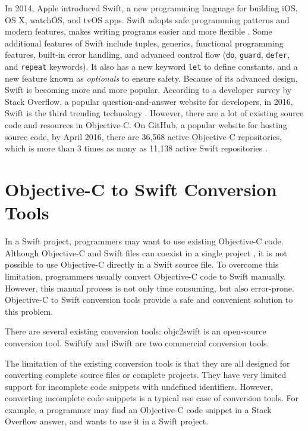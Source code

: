 \documentclass{sfuthesis}
\begin{document}
In 2014, Apple introduced Swift, a new programming language for building iOS, OS X, watchOS, and tvOS apps. Swift adopts safe programming patterns and modern features, makes writing programs easier and more flexible \cite{aboutswift}. Some additional features of Swift include tuples, generics, functional programming features, built-in error handling, and advanced control flow (\texttt{do}, \texttt{guard}, \texttt{defer}, and \texttt{repeat} keywords). It also has a new keyword \texttt{let} to define constants, and a new feature known as \emph{optionals} to ensure safety. Because of its advanced design, Swift is becoming more and more popular. According to a developer survey by Stack Overflow, a popular question-and-answer website for developers, in 2016, Swift is the third trending technology \cite{stackoverflow2016survey}. However, there are a lot of existing source code and resources in Objective-C. On GitHub, a popular website for hosting source code, by April 2016, there are 36,568 active Objective-C repositories, which is more than 3 times as many as 11,138 active Swift repositories \cite{githut}.

\section{Objective-C to Swift Conversion Tools}

In a Swift project, programmers may want to use existing Objective-C code. Although Objective-C and Swift files can coexist in a single project \cite{swiftandobjc}, it is not possible to use Objective-C directly in a Swift source file. To overcome this limitation, programmers usually convert Objective-C code to Swift manually. However, this manual process is not only time consuming, but also error-prone. Objective-C to Swift conversion tools provide a safe and convenient solution to this problem. 

There are several existing conversion tools: objc2swift \cite{objc2swift} is an open-source conversion tool. Swiftify \cite{swiftify} and iSwift \cite{iswift} are two commercial conversion tools.

The limitation of the existing conversion tools is that they are all designed for converting complete source files or complete projects. They have very limited support for incomplete code snippets with undefined identifiers. However, converting incomplete code snippets is a typical use case of conversion tools. For example, a programmer may find an Objective-C code snippet in a Stack Overflow answer, and wants to use it in a Swift project.
\end{document}
